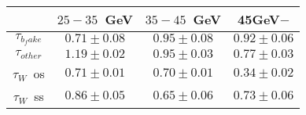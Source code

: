\centering
\begin{tabular}{|c|c|c|c|} \hline
 & $25-35$~GeV & $35-45$~GeV & 45GeV$-$\\\hline
$\tau_{b_fake}$ & $0.71\pm0.08$ & $0.95\pm0.08$ & $0.92\pm0.06$\\\hline
$\tau_{other}$ & $1.19\pm0.02$ & $0.95\pm0.03$ & $0.77\pm0.03$\\\hline
$\tau_{W}$~os & $0.71\pm0.01$ & $0.70\pm0.01$ & $0.34\pm0.02$\\\hline
$\tau_{W}$~ss & $0.86\pm0.05$ & $0.65\pm0.06$ & $0.73\pm0.06$\\\hline
\end{tabular}
